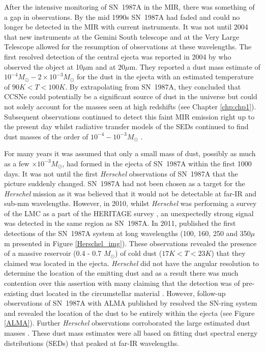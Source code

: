 After the intensive monitoring of SN~1987A in the MIR, there was something of a gap in observations.  By the mid 1990s SN~1987A had faded and could no longer be detected in the MIR with current instruments.  It was not until 2004 that new instruments at the Gemini South telescope and at the Very Large Telescope allowed for the resumption of observations at these wavelengths.  The first resolved detection of the central ejecta was reported in 2004 by \citet{Bouchet2004} who observed the object at 10$\mu$m and at $20\mu$m. They reported a dust mass estimate of $10^{-4}M_{\odot}-2 \times 10^{-3}M_{\odot}$ for the dust in the ejecta with an estimated temperature of $90K<T<100K$.  By extrapolating from SN~1987A, they concluded that CCSNe could potentially be a significant source of dust in the universe but could not solely account for the masses seen at high redshifts (see Chapter \ref{chp:chp1}).  Subsequent observations continued to detect this faint MIR emission right up to the present day \citep{Dwek2010,Bouchet2014} whilst radiative transfer models of the SEDs continued to find dust masses of the order of $10^{-4}-10^{-3}M_{\odot}$ \citep{Ercolano2007}.

For many years it was assumed that only a small mass of dust, possibly as much as a few $\times 10^{-3}M_{\odot}$, had formed in the ejecta of SN~1987A within the first 1000 days.  It was not until the first \textit{Herschel} observations of SN~1987A that the picture suddenly changed.  SN~1987A had not been chosen as a target for the \textit{Herschel} mission as it was believed that it would not be detectable at far-IR and sub-mm wavelengths.  However, in 2010, whilst \textit{Herschel} was performing a survey of the LMC as a part of the HERITAGE survey \citep{Meixner2013}, an unexpectedly strong signal was detected in the same region as SN~1987A.  In 2011, \citet{Matsuura2011} published the first detections of the SN~1987A system at long wavelengths (100, 160, 250 and 350$\mu$m presented in Figure \ref{Herschel_img}).  These observations revealed the presence of a massive reservoir (0.4 - 0.7 $M_{\odot}$) of cold dust ($17K<T<23K$) that they claimed was located in the ejecta.  \textit{Herschel} did not have the angular resolution to determine the location of the emitting dust and as a result there was much contention over this assertion with many claiming that the detection was of pre-existing dust located in the circumstellar material \citep{Bouchet2014}.  However, follow-up observations of SN~1987A with ALMA published by \citet{Indebetouw2014} resolved the SN-ring system and revealed the location of the dust to be entirely within the ejecta (see Figure \ref{ALMA}).  Further \textit{Herschel} observations corroborated the large estimated dust masses \citep{Matsuura2015}.  These dust mass estimates were all based on fitting dust spectral energy distributions (SEDs) that peaked at far-IR wavelengths.


